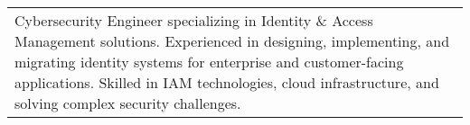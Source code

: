 \begin{center}
\begin{tabular*}{\textwidth}{@{\extracolsep{\fill}}p{\textwidth}}
\raggedright{
Cybersecurity Engineer specializing in Identity \& Access Management solutions. Experienced in designing, implementing, and migrating identity systems for enterprise and customer-facing applications. Skilled in IAM technologies, cloud infrastructure, and solving complex security challenges.
}
\end{tabular*}
\end{center}